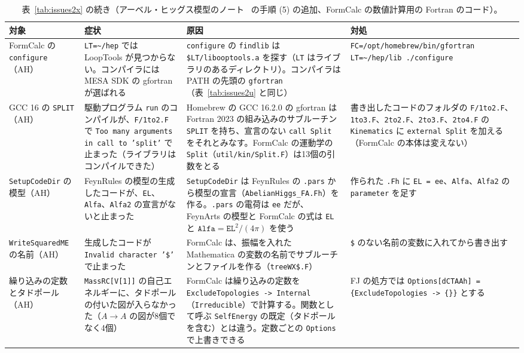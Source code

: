 \documentclass[a4paper,10pt]{ltjsarticle}
\begin{document}
\begin{table}[tbp]
\centering\footnotesize
\caption{表~\ref{tab:issues2x} の続き（アーベル・ヒッグス模型のノート~\cite{ahnote} の手順 (5) の追加、FormCalc の数値計算用の Fortran のコード）。}
\label{tab:issues2y}
\begin{tabularx}{\linewidth}{>{\raggedright\arraybackslash}p{2.4cm}>{\raggedright\arraybackslash}X>{\raggedright\arraybackslash}X>{\raggedright\arraybackslash}X}
\toprule
\textbf{対象} & \textbf{症状} & \textbf{原因} & \textbf{対処} \\
\midrule
FormCalc の \texttt{configure}（AH） & \texttt{LT=\textasciitilde/hep} では LoopTools が見つからない。コンパイラには MESA SDK の gfortran が選ばれる & \texttt{configure} の \texttt{findlib} は \texttt{\$LT/libooptools.a} を探す（\texttt{LT} はライブラリのあるディレクトリ）。コンパイラは PATH の先頭の \texttt{gfortran}（表~\ref{tab:issues2u} と同じ） & \texttt{FC=}\allowbreak\nolinkurl{/opt/homebrew/bin/gfortran} \texttt{LT=\textasciitilde/hep/lib ./configure} \\
GCC 16 の \texttt{SPLIT}（AH） & 駆動プログラム \texttt{run} のコンパイルが、\texttt{F/1to2.F} で \texttt{Too many arguments in call to 'split'} で止まった（ライブラリはコンパイルできた） & Homebrew の GCC 16.2.0 の gfortran は Fortran 2023 の組み込みのサブルーチン \texttt{SPLIT} を持ち、宣言のない \texttt{call Split} をそれとみなす。FormCalc の運動学の \texttt{Split}（\texttt{util/kin/Split.F}）は13個の引数をとる & 書き出したコードのフォルダの \texttt{F/1to2.F}、\texttt{1to3.F}、\texttt{2to2.F}、\texttt{2to3.F}、\texttt{2to4.F} の \texttt{Kinematics} に \texttt{external Split} を加える（FormCalc の本体は変えない） \\
\texttt{SetupCodeDir} の模型（AH） & FeynRules の模型の生成したコードが、\texttt{EL}、\texttt{Alfa}、\texttt{Alfa2} の宣言がないと止まった & \texttt{SetupCodeDir} は FeynRules の \texttt{.pars} から模型の宣言（\texttt{AbelianHiggs\_FA.Fh}）を作る。\texttt{.pars} の電荷は \texttt{ee} だが、FeynArts の模型と FormCalc の式は \texttt{EL} と $\texttt{Alfa}=\texttt{EL}^2/(4\pi)$ を使う & 作られた \texttt{.Fh} に \texttt{EL = ee}、\texttt{Alfa}、\texttt{Alfa2} の \texttt{parameter} を足す \\
\texttt{WriteSquaredME} の名前（AH） & 生成したコードが \texttt{Invalid character '\$'} で止まった & FormCalc は、振幅を入れた Mathematica の変数の名前でサブルーチンとファイルを作る（\texttt{treeWX\$.F}） & \texttt{\$} のない名前の変数に入れてから書き出す \\
繰り込みの定数とタドポール（AH） & \texttt{MassRC[V[1]]} の自己エネルギーに、タドポールの付いた図が入らなかった（$A\to A$ の図が8個でなく4個） & FormCalc は繰り込みの定数を \texttt{ExcludeTopologies -> Internal}（\texttt{Irreducible}）で計算する。関数として呼ぶ \texttt{SelfEnergy} の既定（タドポールを含む）とは違う。定数ごとの \texttt{Options} で上書きできる & FJ の処方では \texttt{Options[dCTAAh] = \{ExcludeTopologies -> \{\}\}} とする \\
\bottomrule
\end{tabularx}
\end{table}
\end{document}
